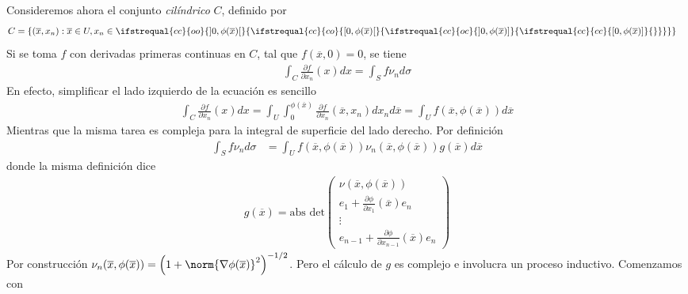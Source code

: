\documentclass{report}
\theoremstyle{definition}
\theoremstyle{remark}
\newcommand{\leftOpenInterval}{\left]}
\newcommand{\rightOpenInterval}{\right[}
\newcommand{\leftClosedInterval}{\left[}
\newcommand{\rightClosedInterval}{\right]}
\newcommand{\interval}[3]{%
  \ifstrequal{#1}{oo}{%
    \leftOpenInterval #2, #3 \rightOpenInterval%
  }{%
    \ifstrequal{#1}{co}{%
      \leftClosedInterval #2, #3 \rightOpenInterval%
    }{%
      \ifstrequal{#1}{oc}{
        \leftOpenInterval #2, #3 \rightClosedInterval%
      }{%
        \ifstrequal{#1}{cc}{
          \leftClosedInterval #2, #3 \rightClosedInterval
        }{%
        }%
      }%
    }%
  }%
}
\begin{document}
  Consideremos ahora el conjunto \emph{cilíndrico} \(C\), definido por
  \begin{align}
    C
    &=
    \{(\overline{x}, x_n) : \overline{x} \in U, x_n \in \interval{cc}{0}{\phi(\overline{x})}\}
  \end{align}
  Si se toma \(f\) con derivadas primeras continuas en \(C\), tal que \(f(\overline{x}, 0) = 0\), se tiene
  \begin{align}
    \label{equation:divergenceTheoremInACylinder}
    \int_C \frac{\partial f}{\partial x_n}(x) dx
    =
    \int_S f \nu_n d \sigma
  \end{align}
  En efecto, simplificar el lado izquierdo de la ecuación es sencillo
  \begin{align}
    \int_C \frac{\partial f}{\partial x_n}(x) dx
    =
    \int_U
      \int_0^{\phi(\overline{x})}
        \frac{\partial f}{\partial x_n} (\overline{x}, x_n)
      d x_n
    d \overline{x}
    =
    \int_U
      f(\overline{x}, \phi(\overline{x}))
    d \overline{x}
  \end{align}
  Mientras que la misma tarea es compleja para la integral de superficie del lado derecho.
  Por definición
  \begin{align}
    \int_S f \nu_n d \sigma
    &=
    \int_U
      f(\overline{x}, \phi(\overline{x}))
      \nu_n(\overline{x}, \phi(\overline{x}))
      g(\overline{x})
    d \overline{x}
  \end{align}
  donde la misma definición dice
  \begin{align}
    g(\overline{x})
    =
    \text{abs det}
    \begin{pmatrix}
      \nu(\overline{x}, \phi(\overline{x}))
      \\
      e_1
      +
      \frac{\partial \phi}{\partial x_1}(\overline{x})
      e_n
      \\
      \vdots
      \\
      e_{n - 1}
      +
      \frac{\partial \phi}{\partial x_{n - 1}}(\overline{x})
      e_n
    \end{pmatrix}
  \end{align}
  Por construcción
  \(
    \nu_n (\overline{x}, \phi(\overline{x}))
    =
    \left(1 + \norm{\nabla \phi (\overline{x})}^2\right)^{- 1 / 2}
  \).
  Pero el cálculo de \(g\) es complejo e involucra un proceso inductivo.
  Comenzamos con
\end{document}
